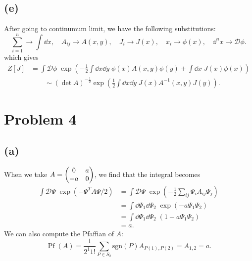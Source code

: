 \documentclass{article}
\begin{document}
\subsection*{(e)}
After going to continumum limit, we have the following substitutions:
\begin{equation}
    \sum_{i=1}^n \to \int \dd{x}, \quad A_{ij} \to A(x,y), \quad J_i \to J(x), \quad x_i \to \phi(x), \quad \dd^n x \to \mathcal{D}\phi.  
\end{equation}
which gives
\begin{equation}
    \begin{split}
        Z[J] &= \int \mathcal{D}\phi \; \exp\left(-\frac{1}{2} \int \dd{x} \dd{y} \; \phi(x) A(x,y) \phi(y) + \int \dd{x} \; J(x) \phi(x)\right)\\
        &\quad\quad\sim (\det A)^{-\frac{1}{2}} \exp\left(\frac{1}{2} \int \dd{x} \dd{y} \; J(x) A^{-1}(x,y) J(y)\right).
    \end{split}
\end{equation}

\section*{Problem 4}
\subsection*{(a)}
When we take $A=\mqty(0&a\\-a&0)$, we find that the integral becomes
\begin{equation}
    \begin{split}
        \int\mathcal{D}\Psi \; \exp(-\Psi^T A \Psi/2) &= \int\mathcal{D}\Psi \; \exp\left(-\frac{1}{2} \sum_{ij} \Psi_i A_{ij} \Psi_j\right)\\
                                                    &= \int\dd{\Psi_1}\dd{\Psi_2} \; \exp(-a \Psi_1 \Psi_2)\\
                                                    &= \int\dd{\Psi_1}\dd{\Psi_2} \; (1 - a \Psi_1 \Psi_2)\\
                                                    &= a.
    \end{split}
\end{equation}
We can also compute the Pfaffian of $A$:
\begin{equation}
    \operatorname{Pf}(A) = \frac{1}{2^1 1!} \sum_{P\in S_2} \text{sgn}(P) A_{P(1),P(2)} = A_{1,2} = a.
\end{equation}
\end{document}
